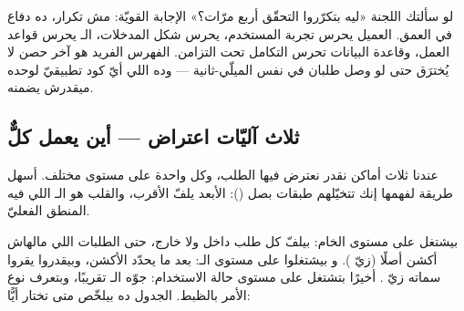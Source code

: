 \begin{spotlight}
لو سألتك اللجنة «ليه بتكرّروا التحقّق أربع مرّات؟» الإجابة القويّة: مش تكرار، ده دفاع في العمق. العميل يحرس تجربة المستخدم،  يحرس شكل المدخلات، الـ يحرس قواعد العمل، وقاعدة البيانات تحرس التكامل تحت التزامن. الفهرس الفريد هو آخر حصن لا يُخترَق حتى لو وصل طلبان في نفس الميلّي-ثانية — وده اللي أيّ كود تطبيقيّ لوحده ميقدرش يضمنه.
\end{spotlight}

\subsection{ثلاث آليّات اعتراض — أين يعمل كلٌّ}

عندنا ثلاث أماكن نقدر نعترض فيها الطلب، وكل واحدة على مستوى مختلف. أسهل طريقة لفهمها إنك تتخيّلهم طبقات بصل (): الأبعد يلفّ الأقرب، والقلب هو الـ اللي فيه المنطق الفعليّ.

\begin{center}\begin{LTR}
\end{LTR}\end{center}

 بيشتغل على مستوى  الخام: بيلفّ كل طلب داخل ولا خارج، حتى الطلبات اللي مالهاش أكشن أصلًا (زيّ ).  و بيشتغلوا على مستوى الـ: بعد ما  يحدّد الأكشن، وبيقدروا يقروا سماته زيّ \code{[Authorize]}. أخيرًا  بتشتغل على مستوى حالة الاستخدام: جوّه الـ تقريبًا، وبتعرف نوع الأمر بالظبط. الجدول ده بيلخّص متى تختار أيًّا:

